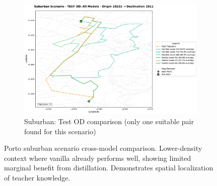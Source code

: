 \begin{figure}[H]
    \centering
    \begin{subfigure}{0.8\linewidth}
        \centering
        \includegraphics[width=\linewidth]{assets/plots/eval/porto/scenario_cross_model/test/suburban/test_od_comparison_1_origin10232_dest2811.pdf}
        \caption{Suburban: Test OD comparison (only one suitable pair found for this scenario)}
    \end{subfigure}
    \caption{Porto suburban scenario cross-model comparison. Lower-density context where vanilla already performs well, showing limited marginal benefit from distillation. Demonstrates spatial localization of teacher knowledge.}
    \label{fig:appendix-porto-scenario-suburban}
\end{figure}
